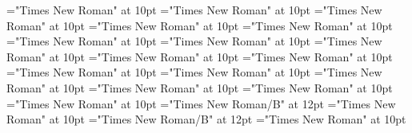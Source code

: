 \documentclass[gps1,twoside]{article}
\begin{document}
\font\variantformentrybackrefsminorentrycomplexbefore="Times New Roman" at 10pt
\font\variantformentrybackrefsminorentrycomplexafter="Times New Roman" at 10pt
\font\variantentrytypevariantentrytypevariantentrytypesvariantformentrybackrefvariantformentrybackrefsminorentrycomplexbefore="Times New Roman" at 10pt
\font\variantentrytypesvariantformentrybackrefvariantformentrybackrefsminorentrycomplexafter="Times New Roman" at 10pt
\font\spanspanreverseabbrvariantentrytypevariantentrytypesvariantformentrybackrefvariantformentrybackrefsminorentrycomplexbefore="Times New Roman" at 10pt
\font\spanreverseabbrvariantentrytypevariantentrytypesvariantformentrybackrefvariantformentrybackrefsminorentrycomplexlastchildafter="Times New Roman" at 10pt
\font\spanspanheadwordvariantformentrybackrefvariantformentrybackrefsminorentrycomplexbefore="Times New Roman" at 10pt
\font\spanspanowningentrysummarydefinitionvariantformentrybackrefvariantformentrybackrefsminorentrycomplexbefore="Times New Roman" at 10pt
\font\spanowningentrysummarydefinitionvariantformentrybackrefvariantformentrybackrefsminorentrycomplexlastchildafter="Times New Roman" at 10pt
\font\spanspanvisiblevariantentryrefsminorentrycomplexbefore="Times New Roman" at 10pt
\font\visiblevariantentryrefsminorentrycomplexafter="Times New Roman" at 10pt
\font\variantentrytypevariantentrytypevariantentrytypesvisiblevariantentryrefvisiblevariantentryrefsminorentrycomplexbefore="Times New Roman" at 10pt
\font\variantentrytypesvisiblevariantentryrefvisiblevariantentryrefsminorentrycomplexafter="Times New Roman" at 10pt
\font\spanspanabbreviationvariantentrytypevariantentrytypesvisiblevariantentryrefvisiblevariantentryrefsminorentrycomplexbefore="Times New Roman" at 10pt
\font\spanabbreviationvariantentrytypevariantentrytypesvisiblevariantentryrefvisiblevariantentryrefsminorentrycomplexlastchildafter="Times New Roman" at 10pt
\font{}="Times New Roman" at 10pt
\font\spanbzhheadwordreferencedentryreferencedentriesvisiblevariantentryrefvisiblevariantentryrefsminorentrycomplex="Times New Roman/B" at 12pt
\font\spanspanheadwordreferencedentryreferencedentriesvisiblevariantentryrefvisiblevariantentryrefsminorentrycomplexbefore="Times New Roman" at 10pt
\font\spanheadwordreferencedentryreferencedentriesvisiblevariantentryrefvisiblevariantentryrefsminorentrycomplex="Times New Roman/B" at 12pt
\font\spanspandefinitionorglossreferencedentryreferencedentriesvisiblevariantentryrefvisiblevariantentryrefsminorentrycomplexbefore="Times New Roman" at 10pt
\end{document}
